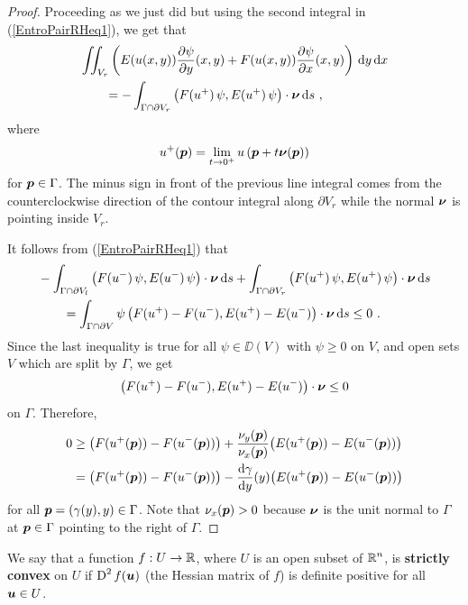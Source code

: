 \begin{proof}
Proceeding as we just did but using the second integral in
(\ref{EntroPairRHeq1}), we get that
\begin{equation} \label{EntroPairRHeq3}
\begin{split}
& \iint_{V_r} \left( E(u(x,y)) \frac{\partial{\psi}}{\partial y}(x,y) +
  F(u(x,y)) \frac{\partial{\psi}}{\partial x}(x,y) \right) \,\mathrm{d}{y}\,\mathrm{d}{x} \\
&\qquad =
-\int_{\Gamma\cap\partial V_r}
\left(F(u^+)\,\psi, E(u^+)\,\psi \right)\cdot {\bm{\nu}} \,\mathrm{d}{s} \ ,
\end{split}
\end{equation}
where
\[
u^+({\bm{p}}) = \lim_{t\rightarrow 0^+}
u\left({\bm{p}}+t {\bm{\nu}}({\bm{p}})\right)
\]
for ${\bm{p}} \in \Gamma$.
The minus sign in front of the previous line integral comes from the
counterclockwise direction of the contour integral along $\partial V_r$
while the normal ${\bm{\nu}}$ is pointing inside $V_r$.

It follows from (\ref{EntroPairRHeq1}) that
\begin{align*}
&-\int_{\Gamma \cap \partial V_l}
\left(F(u^-)\,\psi, E(u^-)\,\psi \right)\cdot {\bm{\nu}} \,\mathrm{d}{s} 
+ \int_{\Gamma\cap\partial V_r}
\left(F(u^+)\,\psi, E(u^+)\,\psi \right)\cdot {\bm{\nu}} \,\mathrm{d}{s}  \\
& \qquad = \int_{\Gamma\cap\partial V} \psi
\left( F(u^+)-F(u^-) , E(u^+) - E(u^-) \right)\cdot {\bm{\nu}} \,\mathrm{d}{s}
\leq 0 \ .
\end{align*}
Since the last inequality is true for all
$\psi \in \DD(V)$ with $\psi \geq 0$ on $V$, and open sets $V$ which
are split by $\Gamma$, we get
\[
\left( F(u^+)-F(u^-) , E(u^+) - E(u^-) \right) \cdot {\bm{\nu}} \leq 0
\]
on $\Gamma$.  Therefore,
\begin{align*}
0 &\geq \big(F(u^+({\bm{p}}))-F(u^-({\bm{p}}))\big)
 + \frac{\nu_y({\bm{p}})}{\nu_x({\bm{p}})}
\big(E(u^+({\bm{p}}))-E(u^-({\bm{p}}))\big) \\
&= \big(F(u^+({\bm{p}}))-F(u^-({\bm{p}}))\big)
- \frac{\mathrm{d}\gamma}{\mathrm{d}{y}}(y) \big(E(u^+({\bm{p}}))-E(u^-({\bm{p}}))\big)
\end{align*}
for all ${\bm{p}}=(\gamma(y),y) \in \Gamma$.
Note that $\nu_x({\bm{p}})>0$ because ${\bm{\nu}}$ is the unit normal to $\Gamma$
at ${\bm{p}} \in \Gamma$ pointing to the right of $\Gamma$.
\end{proof}

We say that a function $f:U \to \mathbb{R}$, where $U$ is an open subset of
$\displaystyle \mathbb{R}^n$, is
{\bfseries strictly convex} on $U$ if
$\displaystyle \operatorname{D}^2 f({\bm{u}})$ (the Hessian matrix of $f$) is definite
positive for all ${\bm{u}} \in U$.

